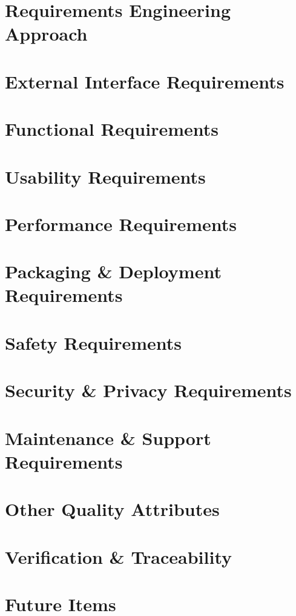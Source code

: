 \documentclass[11pt,letterpaper]{article}
\begin{document}
\section{Requirements Engineering Approach}

\newpage
\section{External Interface Requirements}

\newpage
\section{Functional Requirements}

\newpage
\section{Usability Requirements}

\newpage
\section{Performance Requirements}

\newpage
\section{Packaging \& Deployment Requirements}

\newpage
\section{Safety Requirements}

\newpage
\section{Security \& Privacy Requirements}

\newpage
\section{Maintenance \& Support Requirements}

\newpage
\section{Other Quality Attributes}

\newpage
\section{Verification \& Traceability}

\newpage
\section{Future Items}

\newpage


{}
\end{document}
